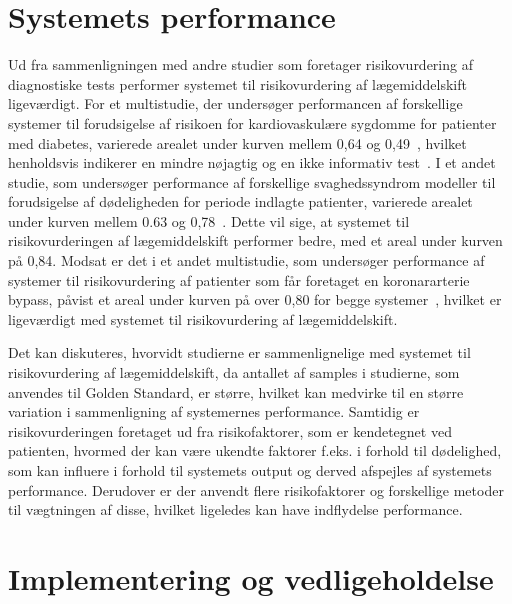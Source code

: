 \section{Systemets performance}
Ud fra sammenligningen med andre studier som foretager risikovurdering af diagnostiske tests performer systemet til risikovurdering af lægemiddelskift ligeværdigt. For et multistudie, der undersøger performancen af forskellige systemer til forudsigelse af risikoen for kardiovaskulære sygdomme for patienter med diabetes, varierede arealet under kurven mellem 0,64 og 0,49~\citep{Chan2009}, hvilket henholdsvis indikerer en mindre nøjagtig og en ikke informativ test~\citep{Greiner2000}. I et andet studie, som undersøger performance af forskellige svaghedssyndrom modeller til forudsigelse af dødeligheden for periode indlagte patienter, varierede arealet under kurven mellem 0.63 og 0,78~\citep{Soong2015}. Dette vil sige, at systemet til risikovurderingen af lægemiddelskift performer bedre, med et areal under kurven på 0,84.  Modsat er det i et andet multistudie, som undersøger performance af systemer til risikovurdering af patienter som får foretaget en koronararterie bypass, påvist et areal under kurven på over 0,80 for begge systemer~\citep{VanStraten2010}, hvilket er ligeværdigt med systemet til risikovurdering af lægemiddelskift.

Det kan diskuteres, hvorvidt studierne er sammenlignelige med systemet til risikovurdering af lægemiddelskift, da antallet af samples i studierne, som anvendes til Golden Standard,  er større, hvilket kan medvirke til en større variation i sammenligning af systemernes performance. Samtidig er risikovurderingen foretaget ud fra risikofaktorer, som er kendetegnet ved patienten, hvormed der kan være ukendte faktorer f.eks. i forhold til dødelighed, som kan influere i forhold til systemets output og derved afspejles af systemets performance. Derudover er der anvendt flere risikofaktorer og forskellige metoder til vægtningen af disse, hvilket ligeledes kan have indflydelse performance. 

\section{Implementering og vedligeholdelse}


